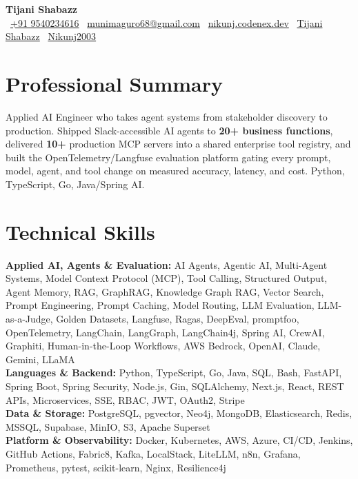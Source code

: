 \documentclass[letterpaper,10pt]{article}
\begin{document}
\begin{center}
  {\Huge \textbf{Tijani Shabazz}}\\
  \vspace{2pt}
  \small
  ~\href{tel:+919540234616}{+91 9540234616} \quad
  ~\href{mailto:munimaguro68@gmail.com}{munimaguro68@gmail.com} \quad
  ~\href{https://tijani-porfolio.dev/}{nikunj.codenex.dev} \quad
  ~\href{https://www.linkedin.com/in/nikunj-khitha/}{Tijani Shabazz} \quad
  ~\href{https://github.com/Nikunj2003}{Nikunj2003}
\end{center}

\section{Professional Summary}
\footnotesize Applied AI Engineer who takes agent systems from stakeholder discovery to production. Shipped Slack-accessible AI agents to \textbf{20+ business functions}, delivered \textbf{10+} production MCP servers into a shared enterprise tool registry, and built the OpenTelemetry/Langfuse evaluation platform gating every prompt, model, agent, and tool change on measured accuracy, latency, and cost. Python, TypeScript, Go, Java/Spring AI.

\section{Technical Skills}
\footnotesize
\textbf{Applied AI, Agents \& Evaluation:} AI Agents, Agentic AI, Multi-Agent Systems, Model Context Protocol (MCP), Tool Calling, Structured Output, Agent Memory, RAG, GraphRAG, Knowledge Graph RAG, Vector Search, Prompt Engineering, Prompt Caching, Model Routing, LLM Evaluation, LLM-as-a-Judge, Golden Datasets, Langfuse, Ragas, DeepEval, promptfoo, OpenTelemetry, LangChain, LangGraph, LangChain4j, Spring AI, CrewAI, Graphiti, Human-in-the-Loop Workflows, AWS Bedrock, OpenAI, Claude, Gemini, LLaMA\\
\textbf{Languages \& Backend:} Python, TypeScript, Go, Java, SQL, Bash, FastAPI, Spring Boot, Spring Security, Node.js, Gin, SQLAlchemy, Next.js, React, REST APIs, Microservices, SSE, RBAC, JWT, OAuth2, Stripe\\
\textbf{Data \& Storage:} PostgreSQL, pgvector, Neo4j, MongoDB, Elasticsearch, Redis, MSSQL, Supabase, MinIO, S3, Apache Superset\\
\textbf{Platform \& Observability:} Docker, Kubernetes, AWS, Azure, CI/CD, Jenkins, GitHub Actions, Fabric8, Kafka, LocalStack, LiteLLM, n8n, Grafana, Prometheus, pytest, scikit-learn, Nginx, Resilience4j
\end{document}
